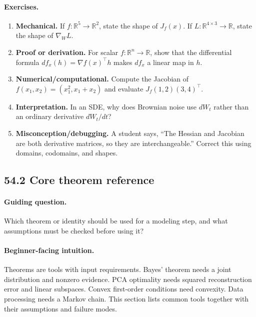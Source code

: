 \paragraph{Exercises.}
\begin{enumerate}[label=\textbf{54.1.\arabic*.}, leftmargin=*]
\item \textbf{Mechanical.} If \(f:\mathbb R^5\to\mathbb R^2\), state the shape of \(J_f(x)\). If \(L:\mathbb R^{4\times3}\to\mathbb R\), state the shape of \(\nabla_W L\).
\item \textbf{Proof or derivation.} For scalar \(f:\mathbb R^n\to\mathbb R\), show that the differential formula \(df_x(h)=\nabla f(x)^\top h\) makes \(df_x\) a linear map in \(h\).
\item \textbf{Numerical/computational.} Compute the Jacobian of \(f(x_1,x_2)=(x_1^2,x_1+x_2)\) and evaluate \(J_f(1,2)(3,4)^\top\).
\item \textbf{Interpretation.} In an SDE, why does Brownian noise use \(dW_t\) rather than an ordinary derivative \(dW_t/dt\)?
\item \textbf{Misconception/debugging.} A student says, ``The Hessian and Jacobian are both derivative matrices, so they are interchangeable.'' Correct this using domains, codomains, and shapes.
\end{enumerate}

\subsection{54.2 Core theorem reference}

\paragraph{Guiding question.}
Which theorem or identity should be used for a modeling step, and what assumptions must be checked before using it?

\paragraph{Beginner-facing intuition.}
Theorems are tools with input requirements. Bayes' theorem needs a joint distribution and nonzero evidence. PCA optimality needs squared reconstruction error and linear subspaces. Convex first-order conditions need convexity. Data processing needs a Markov chain. This section lists common tools together with their assumptions and failure modes.

